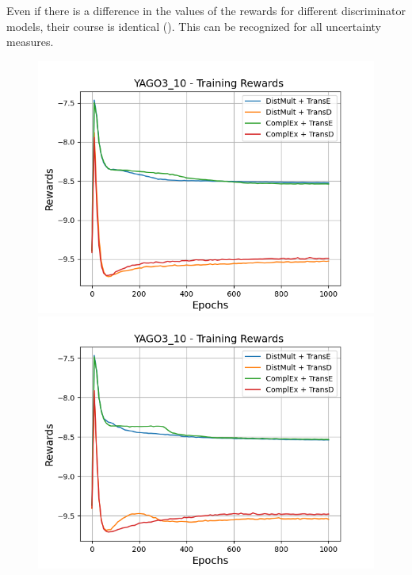 Even if there is a difference in the values of the rewards for different discriminator models, their course is identical ().
This can be recognized for all uncertainty measures.
\begin{figure}[H]
    \centering
    \begin{minipage}{.5\textwidth}
      \centering
      \includegraphics[width=0.9\linewidth]{figures/results/gan_train/not_pretrained/uncertainty/max_distribution/entropy/yago3_10/1k_epochs/uncertainty_yago3_10_rew.png}
    \end{minipage}%
    \begin{minipage}{.5\textwidth}
      \centering
      \includegraphics[width=0.9\linewidth]{figures/results/gan_train/not_pretrained/uncertainty/max_distribution/least_confidence/yago3_10/uncertainty_yago3_10_rew.png}
    \end{minipage}

\end{figure}
